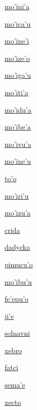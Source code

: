 {\hyperlink{val:mohiniha}{mo'ini'a}}{}{}{}

{\hyperlink{val:mohicahu}{mo'ica'u}}{}{}{}

{\hyperlink{val:mohinehi}{mo'ine'i}}{}{}{}

{\hyperlink{val:mohizeho}{mo'ize'o}}{}{}{}

{\hyperlink{val:mohigahu}{mo'iga'u}}{}{}{}

{\hyperlink{val:mohitiha}{mo'iti'a}}{}{}{}

{\hyperlink{val:mohiduha}{mo'idu'a}}{}{}{}

{\hyperlink{val:mohibeha}{mo'ibe'a}}{}{}{}

{\hyperlink{val:mohivuha}{mo'ivu'a}}{}{}{}

{\hyperlink{val:mohinehu}{mo'ine'u}}{}{}{}

{\hyperlink{val:toho}{to'o}}{}{}{}

{\hyperlink{val:mohirihu}{mo'iri'u}}{}{}{}

{\hyperlink{val:mohizuha}{mo'izu'a}}{}{}{}

{\hyperlink{val:crida}{crida}}{}{}{}

{\hyperlink{val:dadycka}{dadycka}}{}{}{}

{\hyperlink{val:pimucuho}{pimucu'o}}{}{}{}

{\hyperlink{val:mohibuhu}{mo'ibu'u}}{}{}{}

{\hyperlink{val:fehepuho}{fe'epu'o}}{}{}{}

{\hyperlink{val:jihe}{ji'e}}{}{}{}

{\hyperlink{val:solnavni}{solnavni}}{}{}{}

{\hyperlink{val:xebro}{xebro}}{}{}{}

{\hyperlink{val:fatci}{fatci}}{}{}{}

{\hyperlink{val:semahe}{sema'e}}{}{}{}

{\hyperlink{val:xecto}{xecto}}{}{}{}


